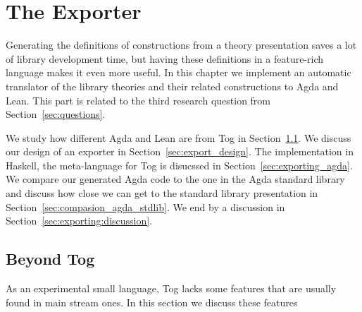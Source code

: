 \chapter{The Exporter}
\label{ch:export}


Generating the definitions of constructions from a theory presentation saves a lot of library development time, but having these definitions in a feature-rich language makes it even more useful. In this chapter we implement an automatic translator of the library theories and their related constructions to Agda and Lean. This part is related to the third research question from Section~\ref{sec:questions}. 

We study how different Agda and Lean are from Tog in Section~\ref{sec:beyongTog}. We discuss our design of an exporter in Section~\ref{sec:export_design}. The implementation in Haskell, the meta-language for Tog is disucssed in Section~\ref{sec:exporting_agda}. We compare our generated Agda code to the one in the Agda standard library~\cite{agda_stdlib} and discuss how close we can get to the standard library presentation in Section~\ref{sec:compasion_agda_stdlib}. 
We end by a discussion in Section~\ref{sec:exporting:discussion}. 

\section{Beyond Tog}
\label{sec:beyongTog}
As an experimental small language, Tog lacks some features that are usually found in main stream ones. In this section we discuss these features 


